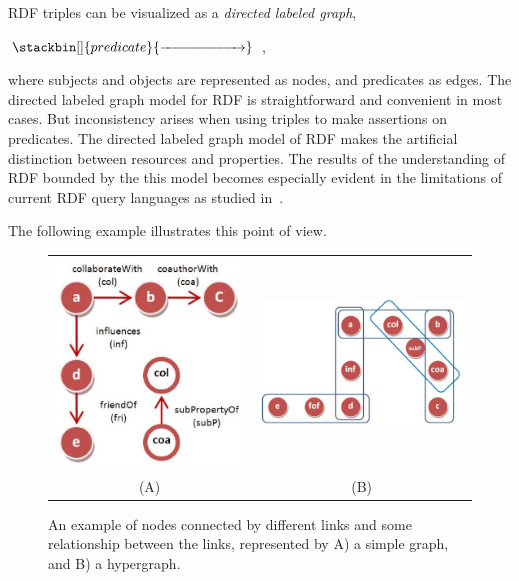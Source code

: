 RDF triples can be visualized as a \emph{directed labeled graph},
\begin{center}
 $\stackbin[]{predicate}{\xrightarrow{\hspace*{2cm}}}$ \;,\\
\end{center}
where subjects and objects are represented as nodes, and predicates as edges. The directed labeled graph model for RDF is straightforward and convenient in most cases. But inconsistency arises when using triples to make assertions on predicates. The directed labeled graph model of RDF makes the artificial distinction between resources and properties. The results of the understanding of RDF bounded by the this model becomes especially evident in the limitations of current RDF query languages as studied in~\cite{Angles04rdfquery}.

The following example illustrates this point of view.

\begin{figure}[tbh]
\begin{center}
\begin{tabular}{cc}
\includegraphics[width=.3\textwidth]{fig/reg_graph.eps} &
\includegraphics[width=.5\textwidth]{fig/hypergraph.eps}\\
(A) & (B)\\
\end{tabular}
\end{center}
\caption{\label{fig:graphcomp} An example of nodes connected by different links and some relationship between the links, represented by A) a simple graph, and B) a hypergraph.}
\end{figure}

